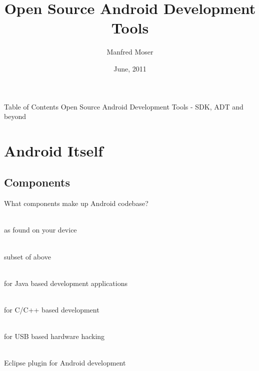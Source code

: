 \documentclass[aspectratio=169]{beamer}
\title{Open Source Android Development Tools}
\author{Manfred Moser}
\date{June, 2011}
\institute{simpligility technologies inc.}
\begin{document}
\begin{frame}
  \titlepage
\end{frame}

\begin{frame}{Table of Contents}
  Open Source Android Development Tools - SDK, ADT and beyond
  \setcounter{tocdepth}{1}
  \tableofcontents
\end{frame}




\section{Android Itself}

  \subsection{Components}
    \begin{frame}{What components make up Android codebase?}
      \begin{description}
        \item<1->[Android Proper] \hfill \\ as found on your device
        \item<2->[Android Open Source Project AOSP] \hfill  \\ subset of above 
        \item<3->[Android Software Development Kit SDK] \hfill  \\ for Java based development applications
        \item<4->[Android Native Development Kit NDK] \hfill  \\ for C/C++ based development
        \item<5->[Android Open Accessory Development Kit ADK] \hfill \\ for USB based hardware hacking
        \item<6->[Android Development Toolkit ADT] \hfill  \\ Eclipse plugin for Android development  
      \end{description}
    \end{frame}
\end{document}
